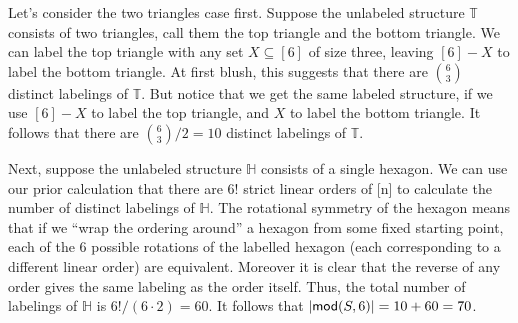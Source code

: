 Let's consider the two triangles case first. Suppose the unlabeled structure $\mathbb{T}$ consists of two triangles, call them the top triangle and the bottom triangle. We can label the top triangle with any set $X\subseteq[6]$ of size three, leaving $[6]-X$ to label the bottom triangle. At first blush, this suggests that there are $\binom{6}{3}$ distinct labelings of $\mathbb{T}$. But notice that we get the same labeled structure, if we use $[6]-X$ to label the top triangle, and $X$ to label the bottom triangle. It follows that there are $\binom{6}{3}/2=10$ distinct labelings of $\mathbb{T}$. 

Next, suppose the unlabeled structure $\mathbb{H}$ consists of a single hexagon. We can use our prior calculation that there are $6!$ strict linear orders of [n] to calculate the number of distinct labelings of $\mathbb{H}$. The rotational symmetry of the hexagon means that if we ``wrap the ordering around'' a hexagon from some fixed starting point, each of the $6$ possible rotations of the labelled hexagon (each corresponding to a different linear order) are equivalent. Moreover it is clear that the reverse of any order gives the same labeling as the order itself. Thus, the total number of labelings of $\mathbb{H}$ is $6!/(6\cdot2)=60$. It follows that $\mbox{$|\mbox{$\mathsf{mod}(S,6)$}|$}=10+60=70$.